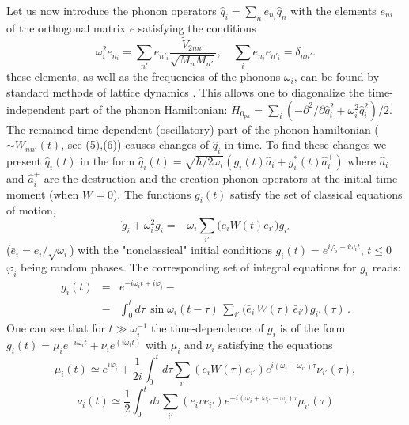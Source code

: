 Let us now introduce the phonon operators 
$\hat{q}_{i}=\sum_{n}{e_{n_{i}}\hat{q}_{n}}$ with the elements $e_{ni}$ of 
the orthogonal matrix $e$ satisfying the conditions
\begin{equation}
\omega_{i}^{2} e_{n_{i}}  =  
\sum_{n'}{e_{n'_{i}} \frac{\tilde{V}_{2nn'}}{\sqrt{M_{n}M_{n'}}}}, 
\quad
\sum_{i}{e_{n_{i}} e_{n'_{i}}}  =  \delta_{nn'}.
\label{eq:om}
\end{equation}
these elements, as well as the frequencies of the phonons $\omega_{i}$, can
be found by standard methods of lattice dynamics \cite{marad}.
This allows one to diagonalize the time-independent part of the phonon
Hamiltonian: 
$H_{0_{ph}}=\sum_i (-\partial^2/\partial\hat{q}_i ^2+
\omega_i^2\hat{q}_i^2)/2$.
The remained time-dependent (oscillatory) part of the phonon hamiltonian
($\sim W_{nn'}(t)$, see (5),(6)) causes changes  of $\hat{q}_i$ in time.
To find these changes we present $\hat{q}_i(t)$ in the form
$\hat{q}_{i}(t)= \sqrt{\hbar/2\omega_{i}}(g_{i}(t) \hat{a}_{i} + 
g_{i}^{*}(t) \hat{a}_{i}^{+})$ where 
$\hat{a}_{i}$ and $\hat{a}_{i}^{+}$ are the destruction and the creation
phonon operators at the initial time moment (when $W=0$). The functions 
$g_{i}(t)$ satisfy the set of classical equations of motion,
\begin{equation}
\ddot{g}_{i} + \omega_{i}^{2} g_{i} = - \omega_{i}
\sum_{i'}{{\big (}\bar{e}_{i} W(t) \bar{e}_{i'}{\big )}g_{i'}}
\label{eq:mot}
\end{equation}
($\bar{e}_{i} = e_{i}/\sqrt{\omega_{i}}$) with the "nonclassical" initial 
conditions $g_{i}(t) = e^{i\varphi_{i} - i\omega_{i} t}$, $t \leq 0$ 
$\varphi_{i}$ being random phases. The corresponding set of integral equations
for $g_{i}$ reads:
\begin{eqnarray}
g_{i}(t) & = & e^{-i\omega_{i} t + i\varphi_{i}} - \nonumber \\ 
& - & \int_{0}^{t}\!{d\tau \,\sin{\omega_{i}(t\!-\!\tau )}\,
\sum_{i'}{{\big (}\bar{e}_{i}\, W(\tau)\, \bar{e}_{i'}{\big
)}\,g_{i'}(\tau)}}\,.
\label{eq:g}
\end{eqnarray}
One can see that for $t\gg \omega_i^{-1}$ the time-dependence of $g_i$ is
of the form $g_i(t) =\mu_i e^{-i\omega_i t} + \nu_i e^{(i\omega_i t)}$ with
$\mu_i$ and $\nu_i$ satisfying the equations
\begin{equation}
\mu_i(t) \simeq e^{i\varphi_i} +\frac{1}{2i} \int_0^t d\tau 
\sum_{i'}(e_i W(\tau) e_{i'}) e^{i(\omega_i - \omega_{i'})\tau}\nu_{i'}(\tau),
\end{equation} 
\begin{equation}
\nu_i(t) \simeq  \frac{1}{2} \int_0^t d\tau
\sum_{i'}(e_i v e_{i'})
e^{-i(\omega_i + \omega_{i'} -\omega_l)\tau}\mu_{i'}(\tau)
\end{equation}

